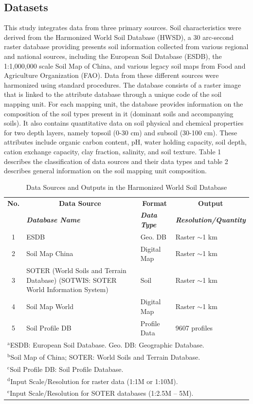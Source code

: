 \subsection{Datasets}
This study integrates data from three primary sources. Soil characteristics were derived from the Harmonized World Soil Database (HWSD), a 30 arc-second raster database providing presents soil information collected from various regional and national sources, including the European Soil Database (ESDB), the 1:1,000,000 scale Soil Map of China, and various legacy soil maps from Food and Agriculture Organization (FAO). Data from these different sources were harmonized using standard procedures. The database consists of a raster image that is linked to the attribute database through a unique code of the soil mapping unit. For each mapping unit, the database provides information on the composition of the soil types present in it (dominant soils and accompanying soils). It also contains quantitative data on soil physical and chemical properties for two depth layers, namely topsoil (0-30 cm) and subsoil (30-100 cm). These attributes include organic carbon content, pH, water holding capacity, soil depth, cation exchange capacity, clay fraction, salinity, and soil texture. Table 1 describes the classification of data sources and their data types and table 2 describes general information on the soil mapping unit composition.

\begin{table}[H]
\caption{Data Sources and Outputs in the Harmonized World Soil Database}
\centering
\begin{tabular}{|c|l|l|l|} 
\hline
\textbf{No.} & \multicolumn{1}{|c|}{\textbf{Data Source}} & \multicolumn{1}{|c|}{\textbf{Format}} & \multicolumn{1}{|c|}{\textbf{Output}} \\
\cline{2-4} 
\textbf{} & \textbf{\textit{Database Name}} & \textbf{\textit{Data Type}} & \textbf{\textit{Resolution/Quantity}} \\
\hline
1 & ESDB & Geo. DB & Raster $\sim$1 km \\
\hline
2 & Soil Map China & Digital Map & Raster $\sim$1 km \\
\hline
3 & SOTER (World Soils and Terrain Database) (SOTWIS: SOTER World Information System) & Soil & Raster $\sim$1 km \\
\hline
4 & Soil Map World & Digital Map & Raster $\sim$1 km \\
\hline
5 & Soil Profile DB & Profile Data & 9607 profiles \\
\hline
\multicolumn{4}{l}{$^{\mathrm{a}}$ESDB: European Soil Database. Geo. DB: Geographic Database.} \\
\multicolumn{4}{l}{$^{\mathrm{b}}$Soil Map of China; SOTER: World Soils and Terrain Database.} \\
\multicolumn{4}{l}{$^{\mathrm{c}}$Soil Profile DB: Soil Profile Database.} \\
\multicolumn{4}{l}{$^{\mathrm{d}}$Input Scale/Resolution for raster data (1:1M or 1:10M).} \\
\multicolumn{4}{l}{$^{\mathrm{e}}$Input Scale/Resolution for SOTER databases (1:2.5M – 5M).}
\end{tabular}
\label{tab:hwsd_sources_compact}
\end{table}

